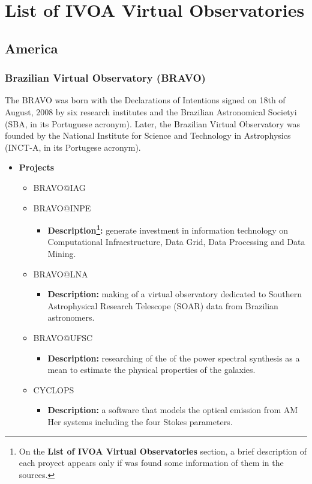 \section{List of IVOA Virtual Observatories}
\subsection{America}
\subsubsection{Brazilian Virtual Observatory (BRAVO)}
The BRAVO was born with the Declarations of Intentions signed on 18th of August,
2008 by six research institutes and the Brazilian Astronomical Societyi (SBA, in
its Portuguese acronym). Later, the Brazilian Virtual Observatory was founded by
the National Institute for Science and Technology in Astrophysics (INCT-A, in
its Portugese acronym).

\begin{itemize}
\item \textbf{Projects}
\begin{itemize}
\item BRAVO@IAG
\item BRAVO@INPE
\begin{itemize}
\item \textbf{Description\footnote{On the \textbf{List of IVOA Virtual
Observatories} section, a brief description of each proyect appears only if was
found some information of them in the sources.}:} generate investment in
information technology on Computational Infraestructure, Data Grid, Data
Processing and Data Mining.
\end{itemize}
\item BRAVO@LNA
\begin{itemize}
\item \textbf{Description:} making of a virtual observatory dedicated to
Southern Astrophysical Research Telescope (SOAR) data from Brazilian
astronomers.  
\end{itemize}
\item BRAVO@UFSC
\begin{itemize}
\item \textbf{Description:} researching of the of the power spectral synthesis
as a mean to estimate the physical properties of the galaxies.
\end{itemize}
\item CYCLOPS
\begin{itemize}
\item \textbf{Description:} a software that models the optical emission from AM
Her systems including the four Stokes parameters.
\end{itemize}
\end{itemize}
\end{itemize}


